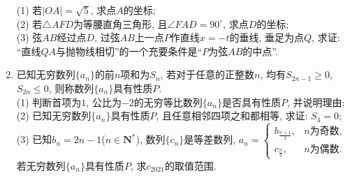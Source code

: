 \documentclass[10pt,a4paper]{article}
\begin{document}
\begin{enumerate}[1.]
\begin{center}
\begin{tikzpicture}[>=latex]
\end{tikzpicture}
\end{center}
(1) 若$|OA|=\sqrt 5$, 求点$A$的坐标;\\
(2) 若$\triangle AFD$为等腰直角三角形, 且$\angle FAD=90^\circ$, 求点$D$的坐标;\\
(3) 弦$AB$经过点$D$, 过弦$AB$上一点$P$作直线$x=-t$的垂线, 垂足为点$Q$, 求证: ``直线$QA$与抛物线相切''的一个充要条件是``$P$为弦$AB$的中点''.
\item 已知无穷数列$\{a_n\}$的前$n$项和为$S_n$, 若对于任意的正整数$n$, 均有$S_{2n-1}\ge 0$, $S_{2n}\le 0$, 则称数列$\{a_n\}$具有性质$P$.\\
(1) 判断首项为$1$, 公比为$-2$的无穷等比数列$\{a_n\}$是否具有性质$P$, 并说明理由;\\
(2) 已知无穷数列$\{a_n\}$具有性质$P$, 且任意相邻四项之和都相等, 求证: $S_4=0$;\\
(3) 已知$b_n=2n-1$($n\in \mathbf{N}^*$), 数列$\{c_n\}$是等差数列, $a_n=\begin{cases}   b_{\frac{n+1}2}, & n\text{为奇数},  \\c_{\frac n2}, &  n\text{为偶数}.  \end{cases}$ 若无穷数列$\{a_n\}$具有性质$P$, 求$c_{2021}$的取值范围.



\end{enumerate}
\end{document}
